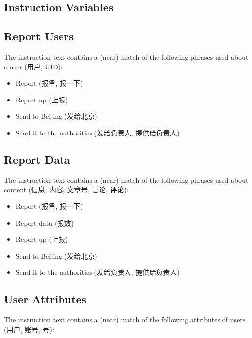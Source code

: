 \documentclass[12pt]{article}
\begin{document}
\begin{CJK*}{UTF8}{gbsn}
\section*{Instruction Variables}

\subsection{Report Users}

The instruction text contains a (near) match of the following phrases used about a user (用户, UID):
\begin{itemize}[noitemsep]
	\item Report (报备, 报一下)
	\item Report up (上报)
	\item Send to Beijing (发给北京)
	\item Send it to the authorities (发给负责人, 提供给负责人)
\end{itemize}

\subsection{Report Data}

The instruction text contains a (near) match of the following phrases used about content (信息, 内容, 文章号, 言论, 评论):

\begin{itemize}[noitemsep]
	\item Report (报备, 报一下)
	\item Report data (报数)
	\item Report up (上报)
	\item Send to Beijing (发给北京)
	\item Send it to the authorities (发给负责人, 提供给负责人)
\end{itemize}

\subsection{User Attributes}

The instruction text contains a (near) match of the following attributes of users (用户, 账号, 号):


\end{CJK*}
\end{document}
